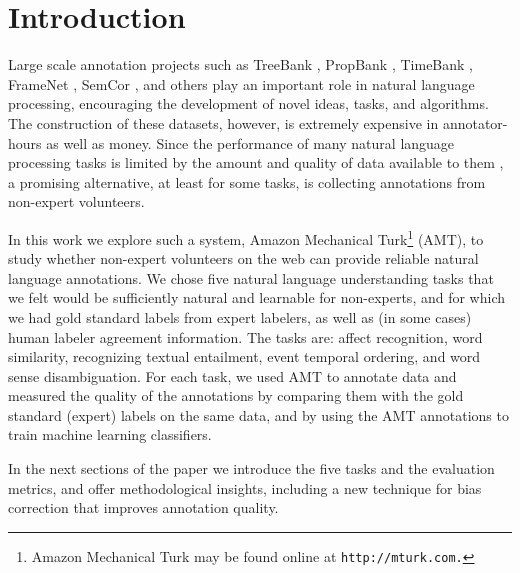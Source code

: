\documentclass[11pt]{article}
\begin{document}
\section{Introduction}

Large scale annotation projects such as TreeBank \cite{TreeBank}, PropBank \cite{PropBank}, TimeBank \cite{TimeBank}, FrameNet \cite{FrameNet}, SemCor
\cite{SemCor}, and others play an
important role in natural language processing,
encouraging the development of novel ideas, tasks, and algorithms.
The construction of these datasets, however, is extremely expensive in annotator-hours as well as money.  Since the performance of many natural language processing tasks is limited by the amount
and quality of data available to them \cite{Banko:01}, a promising alternative, at least for some tasks, is collecting annotations from non-expert volunteers.

In this work we explore such a system, Amazon Mechanical Turk\footnote{Amazon Mechanical Turk may be found online at
\texttt{\scriptsize{http://mturk.com.}}} (AMT), to study whether non-expert volunteers on
the web can provide reliable natural language annotations.
We chose five natural language understanding tasks that we felt would be sufficiently natural and learnable for non-experts, and for which we had gold standard labels from expert labelers, as well as (in some cases) human labeler agreement information.
The tasks are: affect recognition, word similarity, recognizing
textual entailment, event temporal ordering, and word sense
disambiguation.   
For each task, we used AMT to annotate data and
measured the quality of the annotations by comparing them with the
gold standard (expert) labels on the same data, and by using the AMT annotations to train machine learning classifiers. 

In the next sections  of the paper
we introduce the five tasks and the evaluation metrics, and offer
methodological insights, including a new technique for bias correction
that improves annotation quality.

%
\end{document}
